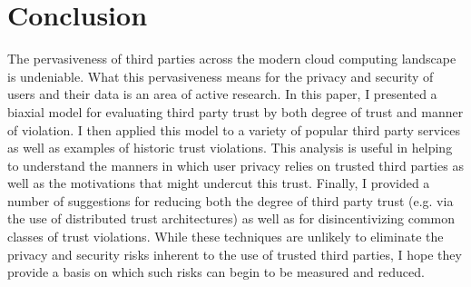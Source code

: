 \section{Conclusion}
\label{sec:conclusion}

The pervasiveness of third parties across the modern cloud computing
landscape is undeniable. What this pervasiveness means for the privacy
and security of users and their data is an area of active research. In
this paper, I presented a biaxial model for evaluating third party
trust by both degree of trust and manner of violation. I then applied
this model to a variety of popular third party services as well as
examples of historic trust violations. This analysis is useful in
helping to understand the manners in which user privacy relies on
trusted third parties as well as the motivations that might undercut
this trust. Finally, I provided a number of suggestions for reducing
both the degree of third party trust (e.g. via the use of distributed
trust architectures) as well as for disincentivizing common classes of
trust violations. While these techniques are unlikely to eliminate the
privacy and security risks inherent to the use of trusted third
parties, I hope they provide a basis on which such risks can begin to
be measured and reduced.
